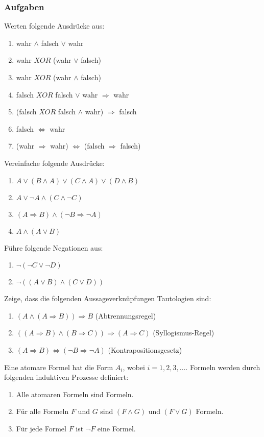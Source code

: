 \subsubsection{Aufgaben}
Werten folgende Ausdrücke aus:
\begin{enumerate}
	\item wahr $\land$ falsch $\lor$ wahr
	\item wahr $XOR$ (wahr $\lor$ falsch)
	\item wahr $XOR$ (wahr $\land$ falsch)
	\item falsch $XOR$ falsch $\lor$ wahr $\Rightarrow$ wahr
	\item (falsch $XOR$ falsch $\land$ wahr) $\Rightarrow$ falsch
	\item falsch $\iff$ wahr
	\item (wahr $\Rightarrow$ wahr) $\iff$ (falsch $\Rightarrow$ falsch)
\end{enumerate}
Vereinfache folgende Ausdrücke:
\begin{enumerate}
	\item $A \lor (B \land A) \lor (C \land A) \lor (D \land B)$
	\item $A \lor \neg A \land (C \land \neg C)$
	\item $(A \Rightarrow B) \land (\neg B \Rightarrow \neg A)$
	\item $A \land (A \lor B)$
\end{enumerate}
Führe folgende Negationen aus:
\begin{enumerate}
	\item $\neg (\neg C \lor \neg D)$
	\item $\neg ((A \lor B) \land (C \lor D))$
\end{enumerate}
Zeige, dass die folgenden Aussageverknüpfungen Tautologien sind:
\begin{enumerate}
	\item $(A \land (A \Rightarrow B)) \Rightarrow B$ (Abtrennungsregel)
	\item $((A \Rightarrow B) \land (B \Rightarrow C)) \Rightarrow (A \Rightarrow C)$ (Syllogismus-Regel)
	\item $(A \Rightarrow B) \iff (\neg B \Rightarrow \neg A)$ (Kontrapositionsgesetz)
\end{enumerate}

Eine atomare Formel hat die Form $A_i$, wobei $i = 1,2,3,\ldots$. Formeln werden durch folgenden induktiven Prozesse definiert:
\begin{enumerate}
\item Alle atomaren Formeln sind Formeln.
\item Für alle Formeln $F$ und $G$ sind $(F \land G)$ und $(F \lor G)$ Formeln.
\item Für jede Formel $F$ ist $\neg F$ eine Formel.
\end{enumerate}

